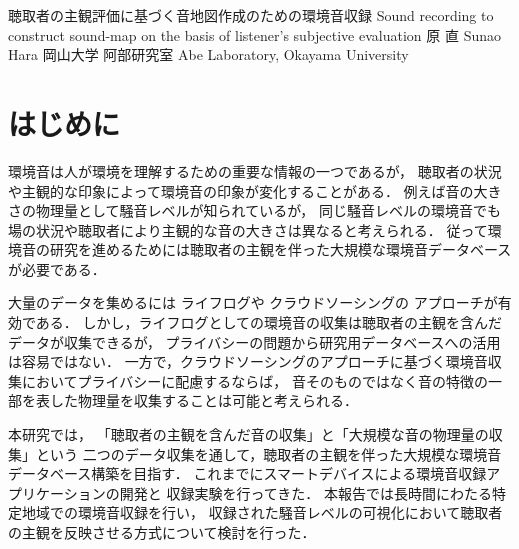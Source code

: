 \documentclass[autodetect-engine,dvi=dvipdfmx,ja=standard,
               a4,twoside,10pt]{bxjsarticle}
\begin{document}
\jeheader %
  {聴取者の主観評価に基づく音地図作成のための環境音収録}
  {Sound recording to construct sound-map on the basis of listener's subjective evaluation}
  {原 直}
  {Sunao Hara}
  {岡山大学 阿部研究室}
  {Abe Laboratory, Okayama University}



\section{はじめに}
環境音は人が環境を理解するための重要な情報の一つであるが，
聴取者の状況や主観的な印象によって環境音の印象が変化することがある．
例えば音の大きさの物理量として騒音レベルが知られているが，
同じ騒音レベルの環境音でも場の状況や聴取者により主観的な音の大きさは異なると考えられる．
従って環境音の研究を進めるためには聴取者の主観を伴った大規模な環境音データベースが必要である．

大量のデータを集めるには
ライフログ\cite{bibMesaros_EUSIPCO2010,bibShah_ESPA2012}や
クラウドソーシング\cite{Rana2010_IPSN_EarPhone,DHondt2012_Journal_NoiseTube}の
アプローチが有効である．
しかし，ライフログとしての環境音の収集は聴取者の主観を含んだデータが収集できるが，
プライバシーの問題から研究用データベースへの活用は容易ではない．
一方で，クラウドソーシングのアプローチに基づく環境音収集においてプライバシーに配慮するならば，
音そのものではなく音の特徴の一部を表した物理量を収集することは可能と考えられる．

本研究では，
「聴取者の主観を含んだ音の収集」と「大規模な音の物理量の収集」という
二つのデータ収集を通して，聴取者の主観を伴った大規模な環境音データベース構築を目指す．
これまでにスマートデバイスによる環境音収録アプリケーションの開発と
収録実験を行ってきた\cite{Hara2014_ASJ1409}．
本報告では長時間にわたる特定地域での環境音収録を行い，
収録された騒音レベルの可視化において聴取者の主観を反映させる方式について検討を行った．

\end{document}
